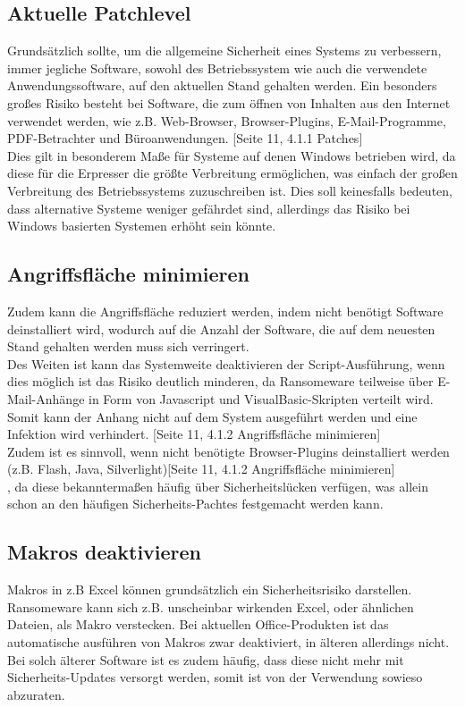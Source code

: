 \subsection{Aktuelle Patchlevel}
	 Grundsätzlich sollte, um die allgemeine Sicherheit eines Systems zu verbessern, immer jegliche Software, sowohl des Betriebssystem wie auch die verwendete Anwendungssoftware, auf den aktuellen Stand gehalten werden. Ein besonders großes Risiko besteht bei Software, die zum öffnen von Inhalten aus den Internet verwendet werden, wie z.B. Web-Browser, Browser-Plugins, E-Mail-Programme, PDF-Betrachter und Büroanwendungen. \cite{bsi:ransome}[Seite 11, 4.1.1 Patches]\\
	 
	 Dies gilt in besonderem Maße für Systeme auf denen Windows betrieben wird, da diese für die Erpresser die größte Verbreitung ermöglichen, was einfach der großen Verbreitung des Betriebssystems zuzuschreiben ist. Dies soll keinesfalls bedeuten, dass alternative Systeme weniger gefährdet sind, allerdings das Risiko bei Windows basierten Systemen erhöht sein könnte.
\subsection{Angriffsfläche minimieren}
	Zudem kann die Angriffsfläche reduziert werden, indem nicht benötigt Software deinstalliert wird, wodurch auf die Anzahl der Software, die auf dem neuesten Stand gehalten werden muss sich verringert.\\
	
	Des Weiten ist kann das Systemweite deaktivieren der Script-Ausführung, wenn dies möglich ist das Risiko deutlich minderen, da Ransomeware teilweise über E-Mail-Anhänge in Form von Javascript und VisualBasic-Skripten verteilt wird. Somit kann der Anhang nicht auf dem System ausgeführt werden und eine Infektion wird verhindert. \cite{bsi:ransome}[Seite 11, 4.1.2 Angriffsfläche minimieren]\\
	
	Zudem ist es sinnvoll, wenn nicht benötigte Browser-Plugins deinstalliert werden (z.B. Flash, Java, Silverlight)\cite{bsi:ransome}[Seite 11, 4.1.2 Angriffsfläche minimieren]\\, da diese bekanntermaßen häufig über Sicherheitslücken verfügen, was allein schon an den häufigen Sicherheits-Pachtes festgemacht werden kann.  
\subsection{Makros deaktivieren}
	Makros in z.B Excel können grundsätzlich ein Sicherheitsrisiko darstellen. Ransomeware kann sich z.B. unscheinbar wirkenden Excel, oder ähnlichen Dateien, als Makro verstecken. Bei aktuellen Office-Produkten ist das automatische ausführen von Makros zwar deaktiviert, in älteren allerdings nicht. Bei solch älterer Software ist es zudem häufig, dass diese nicht mehr mit Sicherheits-Updates versorgt werden, somit ist von der Verwendung sowieso abzuraten. 
